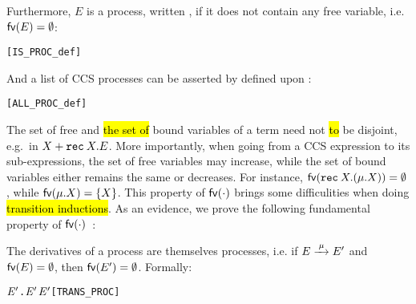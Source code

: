 Furthermore, $E$ is a process, written , if
it does not contain any free variable, i.e. ${{\rm\sf{fv}}}(E) = \emptyset$:
\begin{alltt}
     \HOLTokenDefEquality{}   \HOLSymConst{\ensuremath{=}} \HOLSymConst{\HOLTokenEmpty{}}\hfill{[IS_PROC_def]}
\end{alltt}
And a list of CCS processes can be asserted by  defined upon :
\begin{alltt}
     \HOLTokenDefEquality{}   \hfill{[ALL_PROC_def]}
\end{alltt}

The set of free and \hl{the set of} bound
variables of a term need not \hl{to} be disjoint, e.g.~in $X + {\tt rec}\: X . E$.
More importantly, when going
from a CCS expression to its sub-expressions, the set of free
variables may increase, while the set of bound variables either
remains the same or decreases. For instance, ${{\rm\sf{fv}}}({\tt rec}\: X . (\mu.X)) = \emptyset$, while
${{\rm\sf{fv}}}(\mu.X) = \{X\}$. This property of ${{\rm\sf{fv}}}(\cdot)$ brings some
difficulities when doing \hl{transition inductions}. As an evidence,
we prove the following fundamental property of
${{\rm\sf{fv}}}(\cdot)$~\citep[p.~1209]{milner1990operational}:
%
\begin{proposition}
\label{prop:transFV}
The derivatives of a process are themselves processes, i.e.
if $E \arr{\mu} E'$ and ${{\rm\sf{fv}}}(E) = \emptyset$, then ${{\rm\sf{fv}}}(E') =
\emptyset$. Formally:
\begin{alltt}
\HOLTokenTurnstile{} \HOLSymConst{\HOLTokenForall{}}  \ensuremath{\HOLBoundVar{E}\sp{\prime}}.  \HOLTokenTransBegin{}\HOLTokenTransEnd \ensuremath{\HOLBoundVar{E}\sp{\prime}} \HOLSymConst{\HOLTokenConj{}}   \HOLSymConst{\HOLTokenImp{}}  \ensuremath{\HOLBoundVar{E}\sp{\prime}}\hfill{[TRANS_PROC]}
\end{alltt}
\end{proposition}

